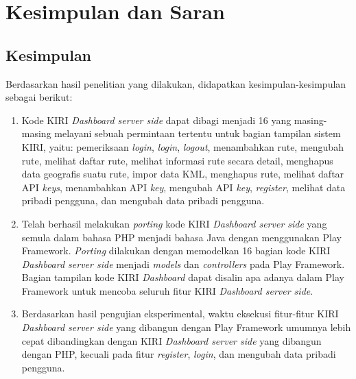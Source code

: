 \chapter{Kesimpulan dan Saran}
\label{chap:kesimpulansaran}

\section{Kesimpulan}
\label{sec:kesimpulan}
Berdasarkan hasil penelitian yang dilakukan, didapatkan kesimpulan-kesimpulan sebagai berikut:
\begin{enumerate}
	\item Kode KIRI \textit{Dashboard server side} dapat dibagi menjadi 16 yang masing-masing melayani sebuah permintaan tertentu untuk bagian tampilan sistem KIRI, yaitu: pemeriksaan \textit{login}, \textit{login}, \textit{logout}, menambahkan rute, mengubah rute, melihat daftar rute, melihat informasi rute secara detail, menghapus data geografis suatu rute, impor data KML, menghapus rute, melihat daftar API \textit{keys}, menambahkan API \textit{key}, mengubah API \textit{key}, \textit{register}, melihat data pribadi pengguna, dan mengubah data pribadi pengguna.
	\item Telah berhasil melakukan \textit{porting} kode KIRI \textit{Dashboard server side} yang semula dalam bahasa PHP menjadi bahasa Java dengan menggunakan Play Framework. \textit{Porting} dilakukan dengan memodelkan 16 bagian kode KIRI \textit{Dashboard server side} menjadi \textit{models} dan \textit{controllers} pada Play Framework. Bagian tampilan kode KIRI \textit{Dashboard} dapat disalin apa adanya dalam Play Framework untuk mencoba seluruh fitur KIRI \textit{Dashboard server side}.
	\item Berdasarkan hasil pengujian eksperimental, waktu eksekusi fitur-fitur KIRI \textit{Dashboard server side} yang dibangun dengan Play Framework umumnya lebih cepat dibandingkan dengan KIRI \textit{Dashboard server side} yang dibangun dengan PHP, kecuali pada fitur \textit{register}, \textit{login}, dan mengubah data pribadi pengguna.
\end{enumerate}

